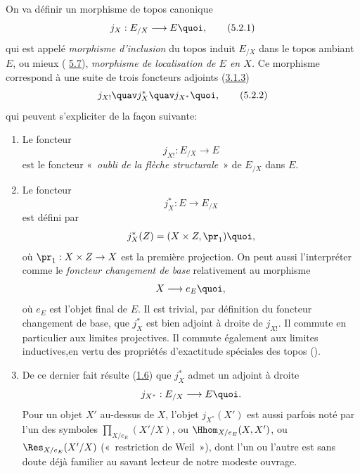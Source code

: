 \documentclass[10pt]{../fichiers-configuration-latex/smfart}
\begin{document}
\subsection{}
On va définir un morphisme de topos canonique
\begin{equation*}
j_X:E_{/X}\longrightarrow E{\quoi},\tag{5.2.1}
\end{equation*}
qui est appelé \emph{morphisme d'inclusion} du topos induit
$E_{/X}$ dans le topos ambiant $E$, ou mieux (\cf
\hyperref[IV.subsec5.7]{5.7}), \emph{morphisme de localisation de $E$ en $X$.}
Ce morphisme correspond à une suite de trois foncteurs adjoints
(\cf \hyperref[IV.subsubsec3.1.3]{3.1.3})
\begin{equation*}
j_{X!}\quav j^{\ast}_X\quav j_{X^{\ast}}{\quoi},\tag{5.2.2}
\end{equation*}
qui peuvent s'expliciter de la façon suivante:
\begin{enumerate}
\renewcommand{\theenumi}{\alph{enumi}}
\renewcommand{\labelenumi}{\theenumi)}
\item Le foncteur
$$
j_{X!}:E_{/X}\longrightarrow E
$$
est le foncteur « \emph{oubli de la flèche structurale} » de
$E_{/X}$ dans $E$.

\item Le foncteur
$$
j^{\ast}_X:E\longrightarrow E_{/X}
$$
est défini par
$$
j^{\ast}_X(Z)=(X\times Z, \pr_1){\quoi},
$$
où $\pr_1:X\times Z\rightarrow X$ est la première projection. On
peut aussi l'interpréter comme le \emph{foncteur changement de
base} relativement au morphisme
$$
X\longrightarrow e_E{\quoi},
$$
où $e_E$ est l'objet final de $E$. Il est trivial, par
définition du foncteur changement de base, que $j^{\ast}_X$ est
bien adjoint à droite de $j_{X!}$. Il commute en particulier aux
limites projectives. Il commute également aux limites
inductives,\pageoriginale en vertu des propriétés d'exactitude
spéciales des topos ().

\item De ce dernier fait résulte (\hyperref[IV.cor1.6]{1.6}) que $j^{\ast}_X$ admet un
adjoint à droite
$$
j_{X^{\ast}}:E_{/X}\longrightarrow E{\quoi}.
$$
Pour un objet $X'$ au-dessus de $X$, l'objet $j_{X^{\ast}}(X')$ est
aussi parfois noté par l'un des symboles $\prod_{X/e_E}(X'/X)$, ou
$\Hhom_{X/e_E}(X,X')$, ou $\Res_{X/e_E}(X'/X)$ (« restriction de
Weil »), dont l'un ou l'autre est sans doute déjà familier au
savant lecteur de notre modeste ouvrage.
\end{enumerate}
\end{document}
